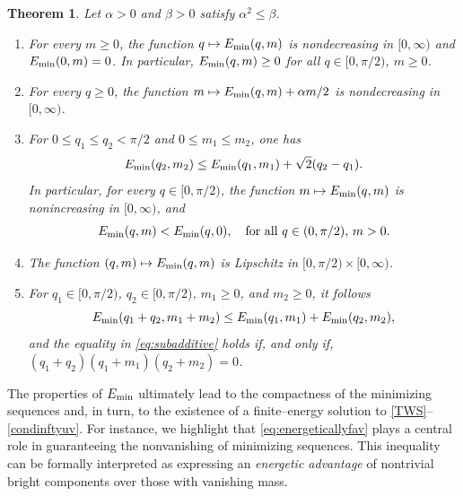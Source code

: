 \documentclass[11pt]{article}
\newcommand{\Emin}{E_\textup{min}}
\theoremstyle{plain}
\newtheorem{theorem}{Theorem}[section]
\theoremstyle{definition}
\theoremstyle{remark}
\numberwithin{equation}{section}
\begin{document}
{\begin{theorem}\label{thm:properties}
	Let $\alpha>0$ and $\beta > 0$ satisfy $\alpha^2\leq\beta$. 
	\begin{enumerate}
		\item \label{item:monotoneq} For every $m\geq 0$, the function $q\mapsto \Emin(q,m)$ is nondecreasing in $[0,\infty)$ and $\Emin(0,m)=0$. In particular, $\Emin(q,m)\geq 0$ for all $q\in [0,\pi/2)$, $m\geq 0$.
		\item \label{item:monotonem} For every $q\geq 0$, the function $m\mapsto \Emin(q,m)+\alpha m/2$ is nondecreasing in $[0,\infty)$. 
		\item \label{item:decreasingm} For $0\leq  q_1\leq q_2<\pi/2$ and $0\leq m_1\leq m_2$, one has
			\begin{equation}\label{lipsineq}
				\Emin(q_2,m_2)\leq \Emin(q_1,m_1)+\sqrt{2}(q_2-q_1).
			\end{equation}
            In particular, for every $q\in [0,\pi/2)$, the function $m\mapsto \Emin(q,m)$ is nonincreasing in $[0,\infty)$, and
            \begin{equation}\label{eq:energeticallyfav}
            \Emin(q,m)<\Emin(q,0),\quad\text{for all }q\in (0,\pi/2),\, m>0.
            \end{equation}
		\item  \label{item:lipschitz} The function $(q,m)\mapsto\Emin(q,m)$ is Lipschitz in $[0,\pi/2)\times[0,\infty)$.
        \item \label{item:subadd} For $q_1\in [0,\pi/2)$, $q_2\in [0,\pi/2)$, $m_1\geq 0$, and $m_2\geq 0$, it follows 
    \begin{equation}\label{eq:subadditive}
    \Emin(q_1+q_2,m_1+m_2)\leq\Emin(q_1,m_1)+\Emin(q_2,m_2),
    \end{equation}
    and the equality in \eqref{eq:subadditive} holds if, and only if, $(q_1+q_2)(q_1+m_1)(q_2+m_2)=0$.
    
	\end{enumerate}
\end{theorem}

The properties of $\Emin$ ultimately lead to the compactness of the minimizing sequences and, in turn, to the existence of a finite--energy solution to \eqref{TWS}--\eqref{condinftyuv}. For instance, we highlight that \eqref{eq:energeticallyfav} plays a central role in guaranteeing the nonvanishing of minimizing sequences. This inequality can be formally interpreted as expressing an \emph{energetic advantage} of nontrivial bright components over those with vanishing mass.

}
\end{document}
